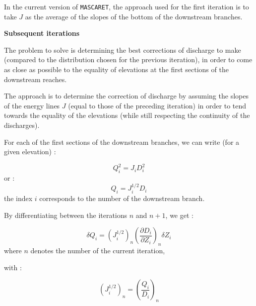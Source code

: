 \vspace{0.5cm}

In the current version of \texttt{MASCARET}, the approach used for the first iteration is to take $J$ as the average of the slopes of the bottom of the downstream branches.

\vspace{0.5cm}

\textbf{Subsequent iterations}

The problem to solve is determining the best corrections of discharge to make (compared to the distribution chosen for the previous iteration), in order to come as close as possible to the equality of elevations at the first sections of the downstream reaches.

\vspace{0.5cm}

The approach is to determine the correction of discharge by assuming the slopes of the energy lines $J$ (equal to those of the preceding iteration) in order to tend towards the equality of the elevations (while still respecting the continuity of the discharges).

\vspace{0.5cm}

For each of the first sections of the downstream branches, we can write (for a given elevation) :

\begin{equation}
 Q_{i}^2 = J_i D_{i}^2
\end{equation}
or :
\begin{equation}
 Q_{i} = J_{i}^{1/2} D_{i}
\end{equation}
the index $i$ corresponds to the number of the downstream branch.

\vspace{0.5cm}

By differentiating between the iterations $n$ and $n+1$, we get :

\begin{equation}
 \label{i1}
 \delta Q_i = ( J_{i}^{1/2} )_n \left ( \frac{\partial D_i}{\partial Z_i} \right )_n \delta Z_i 
\end{equation}
where $n$ denotes the number of the current iteration,

\vspace{0.5cm}

with :

\begin{equation}
 ( J_{i}^{1/2} )_n = \left ( \frac{Q_i}{D_i} \right )_n
\end{equation}

